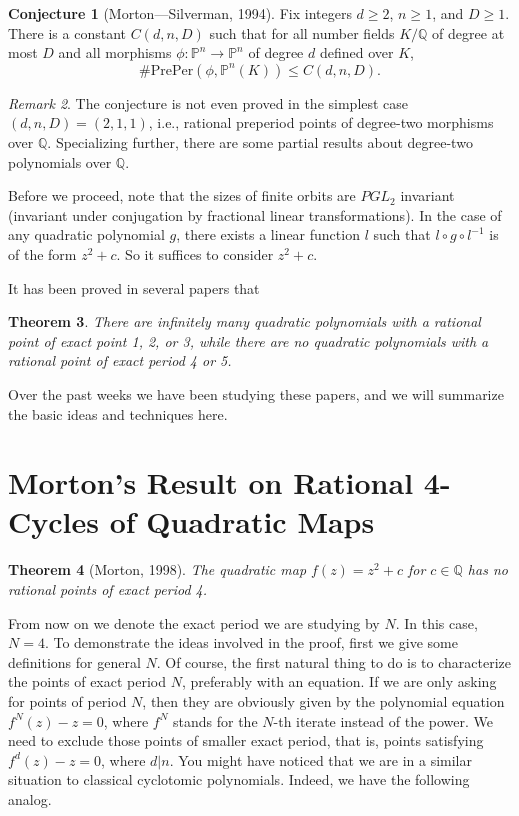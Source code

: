 \documentclass{amsart}
\theoremstyle{plain}
\newtheorem{theorem}{Theorem}[section]
\theoremstyle{definition}
\newtheorem{conjecture}[theorem]{Conjecture}
\theoremstyle{remark}
\newtheorem{remark}[theorem]{Remark}
\renewcommand{\P}{\mathbb{P}}
\newcommand{\Q}{\mathbb{Q}}
\newcommand{\preper}{\mathrm{PrePer}}
\begin{document}
\begin{conjecture}[Morton---Silverman, 1994]
  Fix integers $d \ge 2$, $n \ge 1$, and $D \ge 1$. There is a
  constant $C(d, n, D)$ such that for all number fields $K/\Q$ of
  degree at most $D$ and all morphisms $\phi: \P^n \to \P^n$ of degree
  $d$ defined over $K$,
  \[
  \#\preper(\phi, \P^n(K)) \le C(d, n, D).
  \]
\end{conjecture}

\begin{remark}
  The conjecture is not even proved in the simplest case $(d, n, D) =
  (2, 1, 1)$, i.e., rational preperiod points of degree-two morphisms
  over $\Q$. Specializing further, there are some partial results
  about degree-two polynomials over $\Q$.

  Before we proceed, note that the sizes of finite orbits are $PGL_2$
  invariant (invariant under conjugation by fractional linear
  transformations). In the case of any quadratic polynomial $g$, there
  exists a linear function $l$ such that $l \circ g \circ l^{-1}$ is
  of the form $z^2 + c$. So it suffices to consider $z^2 + c$.

  It has been proved in several papers that
\end{remark}

\begin{theorem}
  There are infinitely many quadratic polynomials with a rational
  point of exact point 1, 2, or 3, while there are no quadratic
  polynomials with a rational point of exact period 4 or 5.
\end{theorem}

Over the past weeks we have been studying these papers, and we will
summarize the basic ideas and techniques here.



\section{Morton's Result on Rational 4-Cycles of Quadratic Maps}

\begin{theorem} [Morton, 1998]
  The quadratic map $f(z) = z^2 + c$ for $c \in \Q$ has no rational
  points of exact period 4.
\end{theorem}

From now on we denote the exact period we are studying by $N$. In this
case, $N = 4$. To demonstrate the ideas involved in the proof, first
we give some definitions for general $N$. Of course, the first natural
thing to do is to characterize the points of exact period $N$,
preferably with an equation. If we are only asking for points of
period $N$, then they are obviously given by the polynomial equation
$f^N(z) - z = 0$, where $f^N$ stands for the $N$-th iterate instead of
the power. We need to exclude those points of smaller exact period,
that is, points satisfying $f^d(z) - z = 0$, where $d | n$. You might
have noticed that we are in a similar situation to classical
cyclotomic polynomials. Indeed, we have the following analog.
\end{document}

